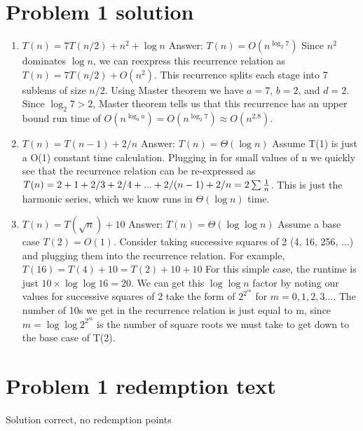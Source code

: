 \documentclass[11pt]{article}
\newenvironment{qparts}{\begin{enumerate}[{(}a{)}]}{\end{enumerate}}
\begin{document}
\section*{Problem 1 solution}
\begin{qparts}
\item
\begin{math}
T(n)=7T(n/2) + n^2 + \log n
\end{math}
\newline
Answer: $T(n) = O(n^{\log_2 7})$\newline
Since $n^2$ dominates $\log n$, we can reexpress this recurrence relation as $
T(n)=7T(n/2) + O(n^2)$. This recurrence splits each stage into 7 sublems of size $n/2$. Using Master theorem we have $a=7$, $b=2$, and $d=2$. Since $\log_2 7 > 2$, Master theorem tells us that this recurrence has an upper bound run time of $O(n^{\log_b a}) = O(n^{\log_2 7}) \approx O(n^{2.8})$.
\item
$T(n)=T(n-1) + 2/n$\newline
Answer: $T(n) = \Theta(\log n)$\newline
Assume T(1) is just a O(1) constant time calculation. Plugging in for small values of n we quickly see that the recurrence relation can be re-expressed as $T(n)=2 + 1 + 2/3 + 2/4 + ... + 2/(n-1) + 2/n = 2 \sum{1\over n}$. This is just the harmonic series, which we know runs in $\Theta(\log n)$ time.\newline


\item
$T(n)=T(\sqrt{n}) + 10$\newline
Answer: $T(n)=\Theta(\log \log n)$\newline
Assume a base case $T(2) = O(1)$. Consider taking successive squares of 2 (4, 16, 256, ...) and plugging them into the recurrence relation. For example, $T(16) = T(4) + 10 = T(2)+10+10$ For this simple case, the runtime is just $10\times \log \log16 = 20$. We can get this $\log\log n$ factor by noting our values for successive squares of 2 take the form of $2^{2^m}$ for $m = 0,1,2,3...$. The number of 10s we get in the recurrence relation is just equal to m, since $m = \log \log 2^{2^m}$ is the number of square roots we must take to get down to the base case of T(2).

\end{qparts}

\newpage
\section*{Problem 1 redemption text}
Solution correct, no redemption points
\end{document}
